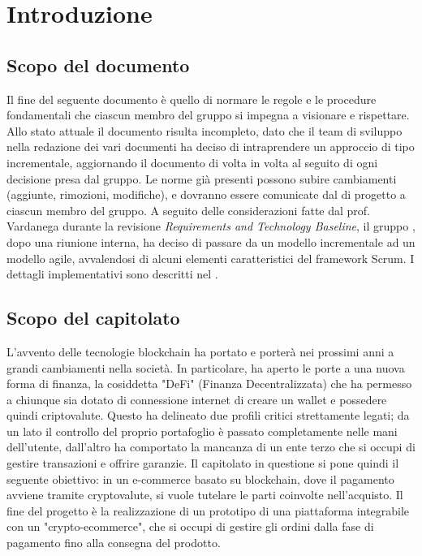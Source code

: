 \section{Introduzione} \label{section: introduzione}

\subsection {Scopo del documento} \label{subsection:scopo}
Il fine del seguente documento è quello di normare le regole e le procedure fondamentali che ciascun membro del gruppo \groupName{} si impegna a visionare e rispettare.
Allo stato attuale il documento risulta incompleto, dato che il team di sviluppo nella redazione dei vari documenti ha deciso di intraprendere un approccio di tipo incrementale, aggiornando il documento di volta in volta al seguito di ogni decisione presa dal gruppo.
Le norme già presenti possono subire cambiamenti (aggiunte, rimozioni, modifiche), e dovranno essere comunicate dal \roleProjectManagerLow{} di progetto a ciascun membro del gruppo.
A seguito delle considerazioni fatte dal prof. Vardanega durante la revisione \textit{Requirements and Technology Baseline}, il gruppo \groupName{}, dopo una riunione interna, ha deciso di passare da un modello incrementale ad un modello agile, avvalendosi di alcuni elementi caratteristici del framework Scrum\glo{}. I dettagli implementativi sono descritti nel \docNameVersionPdP{}.
\vspace{1cm}

\subsection{Scopo del capitolato}
L'avvento delle tecnologie blockchain\glo{} ha portato e porterà nei prossimi anni a grandi cambiamenti nella società.
In particolare, ha aperto le porte a una nuova forma di finanza, la cosiddetta "DeFi" (Finanza Decentralizzata) che ha permesso a chiunque sia dotato di connessione internet di creare un wallet\glo{} e possedere quindi criptovalute\glo{}.
Questo ha delineato due profili critici strettamente legati; da un lato il controllo del proprio portafoglio è passato completamente nelle mani dell'utente, dall'altro ha comportato la mancanza di un ente terzo che si occupi di gestire transazioni e offrire garanzie.
\newline
Il capitolato in questione si pone quindi il seguente obiettivo: in un e-commerce\glo{} basato su blockchain\glo{}, dove il pagamento avviene tramite cryptovalute\glo{}, si vuole tutelare le parti coinvolte nell'acquisto.
\newline
Il fine del progetto è la realizzazione di un prototipo di una piattaforma integrabile con un "crypto-ecommerce\glo{}", che si occupi di gestire gli ordini dalla fase di pagamento fino alla consegna del prodotto.


